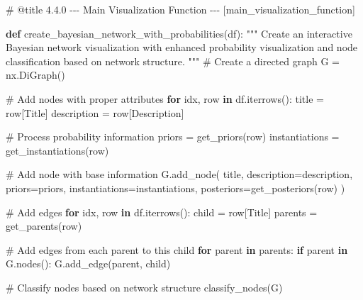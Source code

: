\documentclass[
  11pt,
  letterpaper,
]{book}
\newenvironment{Shaded}{\begin{snugshade}}{\end{snugshade}}
\newcommand{\CommentTok}[1]{\textcolor[rgb]{0.37,0.37,0.37}{#1}}
\newcommand{\ControlFlowTok}[1]{\textcolor[rgb]{0.00,0.23,0.31}{\textbf{#1}}}
\newcommand{\KeywordTok}[1]{\textcolor[rgb]{0.00,0.23,0.31}{\textbf{#1}}}
\newcommand{\NormalTok}[1]{\textcolor[rgb]{0.00,0.23,0.31}{#1}}
\newcommand{\OperatorTok}[1]{\textcolor[rgb]{0.37,0.37,0.37}{#1}}
\newcommand{\StringTok}[1]{\textcolor[rgb]{0.13,0.47,0.30}{#1}}
\begin{document}
\begin{Shaded}
\begin{Highlighting}[]
\CommentTok{\# @title 4.4.0 {-}{-}{-} Main Visualization Function {-}{-}{-} [main\_visualization\_function]}

\KeywordTok{def}\NormalTok{ create\_bayesian\_network\_with\_probabilities(df):}
    \CommentTok{"""}
\CommentTok{    Create an interactive Bayesian network visualization with enhanced}
\CommentTok{    probability visualization and node classification based on network structure.}
\CommentTok{    """}
    \CommentTok{\# Create a directed graph}
\NormalTok{    G }\OperatorTok{=}\NormalTok{ nx.DiGraph()}

    \CommentTok{\# Add nodes with proper attributes}
    \ControlFlowTok{for}\NormalTok{ idx, row }\KeywordTok{in}\NormalTok{ df.iterrows():}
\NormalTok{        title }\OperatorTok{=}\NormalTok{ row[}\StringTok{\textquotesingle{}Title\textquotesingle{}}\NormalTok{]}
\NormalTok{        description }\OperatorTok{=}\NormalTok{ row[}\StringTok{\textquotesingle{}Description\textquotesingle{}}\NormalTok{]}

        \CommentTok{\# Process probability information}
\NormalTok{        priors }\OperatorTok{=}\NormalTok{ get\_priors(row)}
\NormalTok{        instantiations }\OperatorTok{=}\NormalTok{ get\_instantiations(row)}

        \CommentTok{\# Add node with base information}
\NormalTok{        G.add\_node(}
\NormalTok{            title,}
\NormalTok{            description}\OperatorTok{=}\NormalTok{description,}
\NormalTok{            priors}\OperatorTok{=}\NormalTok{priors,}
\NormalTok{            instantiations}\OperatorTok{=}\NormalTok{instantiations,}
\NormalTok{            posteriors}\OperatorTok{=}\NormalTok{get\_posteriors(row)}
\NormalTok{        )}

    \CommentTok{\# Add edges}
    \ControlFlowTok{for}\NormalTok{ idx, row }\KeywordTok{in}\NormalTok{ df.iterrows():}
\NormalTok{        child }\OperatorTok{=}\NormalTok{ row[}\StringTok{\textquotesingle{}Title\textquotesingle{}}\NormalTok{]}
\NormalTok{        parents }\OperatorTok{=}\NormalTok{ get\_parents(row)}

        \CommentTok{\# Add edges from each parent to this child}
        \ControlFlowTok{for}\NormalTok{ parent }\KeywordTok{in}\NormalTok{ parents:}
            \ControlFlowTok{if}\NormalTok{ parent }\KeywordTok{in}\NormalTok{ G.nodes():}
\NormalTok{                G.add\_edge(parent, child)}

    \CommentTok{\# Classify nodes based on network structure}
\NormalTok{    classify\_nodes(G)}


\end{Highlighting}
\end{Shaded}
\end{document}
